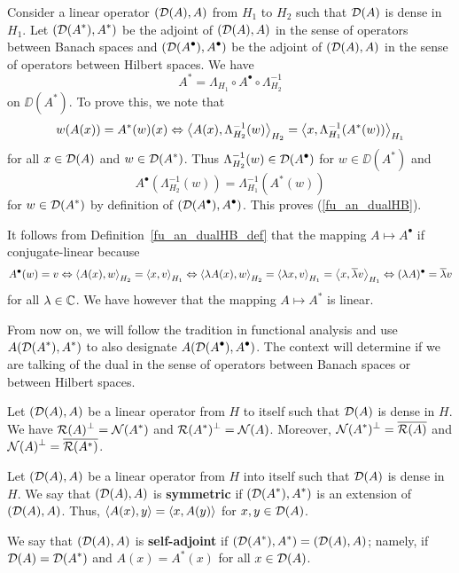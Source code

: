 Consider a linear operator $(\mathcal{D}(A),A)$ from $H_1$ to $H_2$ such
that $\mathcal{D}(A)$ is dense in $H_1$.  Let
$\displaystyle (\mathcal{D}(A^\ast),A^\ast)$ be the
adjoint of $(\mathcal{D}(A),A)$ in the sense of operators between Banach
spaces and $\displaystyle (\mathcal{D}(A^\bullet),A^\bullet)$ be the adjoint
of $(\mathcal{D}(A),A)$ in the sense of operators between Hilbert spaces.  We have
\begin{equation} \label{fu_an_dualHB}
A^\ast = \Lambda_{H_1} \circ A^\bullet \circ \Lambda_{H_2}^{-1}
\end{equation}
on $\displaystyle \DD(A^\ast)$.  To prove this, we note that
\[
w(A(x)) = A^\ast(w)(x) \Leftrightarrow
\left\langle{A(x)} , {\Lambda_{H_2}^{-1}(w)}\right\rangle_{H_2} =
\left\langle{x} , {\Lambda_{H_1}^{-1}(A^\ast(w))}\right\rangle_{H_1}
\]
for all $x \in \mathcal{D}(A)$ and $\displaystyle w\in \mathcal{D}(A^\ast)$.  Thus
$\displaystyle \Lambda_{H_2}^{-1}(w) \in \mathcal{D}(A^\bullet)$
for $\displaystyle w \in \DD(A^\ast)$ and
\[
A^\bullet(\Lambda_{H_2}^{-1}(w)) = \Lambda_{H_1}^{-1}(A^\ast(w))
\]
for $\displaystyle w\in \mathcal{D}(A^\ast)$ by definition of
$\displaystyle (\mathcal{D}(A^\bullet),A^\bullet)$.  This proves (\ref{fu_an_dualHB}).

It follows from Definition~\ref{fu_an_dualHB_def} that
the mapping $\displaystyle A \mapsto A^\bullet$ if conjugate-linear
because
\[
A^\bullet(w) = v
\Leftrightarrow \left\langle{A(x)} , {w}\right\rangle_{H_2} = \left\langle{x} , {v}\right\rangle_{H_1}
\Leftrightarrow \left\langle{\lambda A(x)} , {w}\right\rangle_{H_2} = \left\langle{\lambda x} , {v}\right\rangle_{H_1}
= \left\langle{x} , {\overline{\lambda} v}\right\rangle_{H_1}
\Leftrightarrow (\lambda A)^\bullet = \overline{\lambda} v
\]
for all $\lambda \in \mathbb{C}$.  We have
however that the mapping $\displaystyle A \mapsto A^\ast$ is linear.

From now on, we will follow the tradition in functional analysis and
use $\displaystyle A (\mathcal{D}(A^\ast),A^\ast)$ to also designate
$\displaystyle A (\mathcal{D}(A^\bullet),A^\bullet)$.  The context will determine if we are
talking of the dual in the sense of operators between Banach spaces or
between Hilbert spaces.

\begin{theorem} \label{fu_an_RIOrth}
Let $(\mathcal{D}(A),A)$ be a linear operator from $H$ to itself
such that $\mathcal{D}(A)$ is dense in $H$.  We have
$\displaystyle \mathcal{R}(A)^\perp = \mathcal{N}(A^\ast)$ and
$\displaystyle \mathcal{R}(A^\ast)^\perp = \mathcal{N}(A)$.
Moreover, $\displaystyle \mathcal{N}(A^\ast)^\perp = \overline{\mathcal{R}(A)}$ and
$\displaystyle \mathcal{N}(A)^\perp = \overline{\mathcal{R}(A^\ast)}$.
\end{theorem}

\begin{defn}
Let $(\mathcal{D}(A),A)$ be a linear operator from $H$ into itself
such that $\mathcal{D}(A)$ is dense in $H$.  We say that $(\mathcal{D}(A),A)$ is
{\bfseries symmetric}
if $\displaystyle (\mathcal{D}(A^\ast),A^\ast)$ is an extension of $(\mathcal{D}(A),A)$.  Thus,
$\displaystyle \left\langle{A(x)} , {y}\right\rangle = \left\langle{x} , {A(y)}\right\rangle$ for $x,y \in \mathcal{D}(A)$.

We say that $(\mathcal{D}(A),A)$ is
{\bfseries self-adjoint} if
$\displaystyle (\mathcal{D}(A^\ast),A^\ast) = (\mathcal{D}(A),A)$; namely, if
$\displaystyle \mathcal{D}(A)=\mathcal{D}(A^\ast)$ and
$\displaystyle A(x)=A^\ast(x)$ for all $x \in \mathcal{D}(A)$.
\end{defn}

